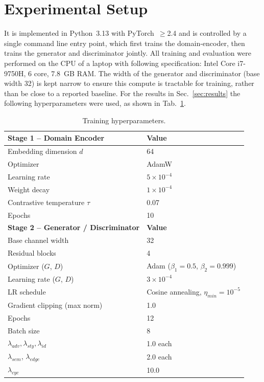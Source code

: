 \documentclass[conference]{IEEEtran}
\begin{document}
\section{Experimental Setup}
\label{sec:setup}
It is implemented in Python~3.13 with PyTorch~$\geq$2.4 and is controlled by a single command line entry point, which first trains the domain-encoder, then trains the generator and discriminator jointly. All training and evaluation were performed on the CPU of a laptop with following specification: Intel Core i7-9750H, 6 core, 7.8~GB RAM. The width of the generator and discriminator (base width 32) is kept narrow to ensure this compute is tractable for training, rather than be close to a reported baseline. For the results in Sec.~\ref{sec:results} the following hyperparameters were used, as shown in Tab.~\ref{tab:hyperparams}.

\begin{table}[t]
\centering
\caption{Training hyperparameters.}
\label{tab:hyperparams}
\begin{tabular}{@{}ll@{}}
\toprule
\textbf{Stage 1 -- Domain Encoder} & \textbf{Value} \\
\midrule
Embedding dimension $d$            & 64 \\
Optimizer                          & AdamW \\
Learning rate                      & $5\times10^{-4}$ \\
Weight decay                       & $1\times10^{-4}$ \\
Contrastive temperature $\tau$     & 0.07 \\
Epochs                             & 10 \\
\midrule
\textbf{Stage 2 -- Generator / Discriminator} & \textbf{Value} \\
\midrule
Base channel width                 & 32 \\
Residual blocks                    & 4 \\
Optimizer ($G$, $D$)               & Adam ($\beta_1{=}0.5$, $\beta_2{=}0.999$) \\
Learning rate ($G$, $D$)           & $3\times10^{-4}$ \\
LR schedule                        & Cosine annealing, $\eta_{min}{=}10^{-5}$ \\
Gradient clipping (max norm)       & 1.0 \\
Epochs                             & 12 \\
Batch size                         & 8 \\
$\lambda_{adv},\lambda_{sty},\lambda_{id}$ & 1.0 each \\
$\lambda_{sem}$, $\lambda_{edge}$  & 2.0 each \\
$\lambda_{cyc}$                    & 10.0 \\
\bottomrule
\end{tabular}
\end{table}
\end{document}
